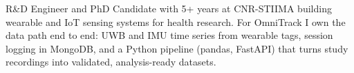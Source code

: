{R\&D Engineer and PhD Candidate with 5+ years at CNR-STIIMA building wearable and IoT sensing systems for health research. For OmniTrack I own the data path end to end: UWB and IMU time series from wearable tags, session logging in MongoDB, and a Python pipeline (pandas, FastAPI) that turns study recordings into validated, analysis-ready datasets.}

